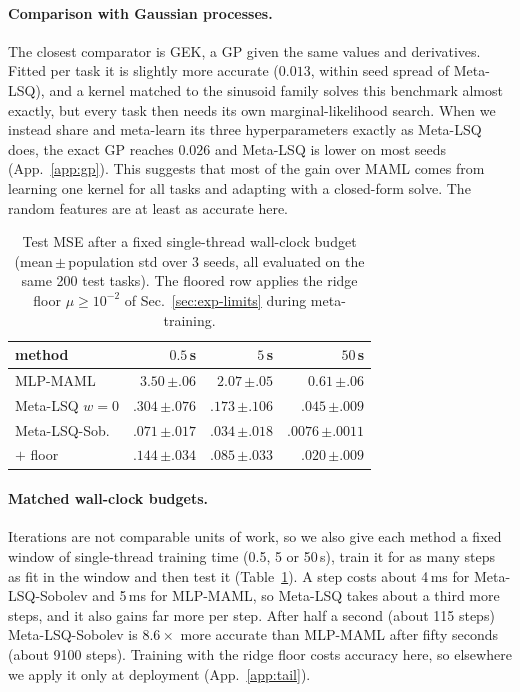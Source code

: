 \documentclass[fullpaper,final]{nldl}
\theoremstyle{plain}
\theoremstyle{definition}
\begin{document}
\paragraph{Comparison with Gaussian processes.}
The closest comparator is GEK, a GP given the same values and derivatives. Fitted
per task it is
slightly more accurate ($0.013$, within seed spread of Meta-LSQ), and a kernel
matched to the sinusoid family solves this benchmark almost exactly, but every task
then needs its own marginal-likelihood search. When we instead share and meta-learn
its three hyperparameters exactly as Meta-LSQ does, the exact GP reaches $0.026$ and
Meta-LSQ is lower on most seeds (App.~\ref{app:gp}). This suggests that most of the
gain over MAML comes from learning one kernel for all tasks and adapting with a
closed-form solve. The random features are at least as accurate here.

\begin{table}[tb]
\centering
\caption{Test MSE after a fixed single-thread wall-clock budget (mean\,$\pm$\,population
std over 3 seeds, all evaluated on the same 200 test tasks). The floored row
applies the ridge floor $\mu \geq 10^{-2}$ of Sec.~\ref{sec:exp-limits} during
meta-training.}
\label{tab:wallclock}
\footnotesize
\setlength{\tabcolsep}{2pt}
\begin{tabular}{lrrr}
\toprule
method & $0.5$\,s & $5$\,s & $50$\,s \\
\midrule
MLP-MAML           & $3.50$\,\tiny$\pm.06$   & $2.07$\,\tiny$\pm.05$   & $0.61$\,\tiny$\pm.06$ \\
Meta-LSQ $w{=}0$   & $.304$\,\tiny$\pm.076$  & $.173$\,\tiny$\pm.106$  & $.045$\,\tiny$\pm.009$ \\
Meta-LSQ-Sob.\     & $\mathbf{.071}$\,\tiny$\pm.017$ & $\mathbf{.034}$\,\tiny$\pm.018$ & $\mathbf{.0076}$\,\tiny$\pm.0011$ \\
\quad $+$ floor    & $.144$\,\tiny$\pm.034$  & $.085$\,\tiny$\pm.033$  & $.020$\,\tiny$\pm.009$ \\
\bottomrule
\end{tabular}
\end{table}

\paragraph{Matched wall-clock budgets.}
Iterations are not comparable units of work, so we also give each method a fixed
window of single-thread training time (0.5, 5 or 50\,s), train it for as many steps
as fit in the window and then test it (Table~\ref{tab:wallclock}). A step costs
about 4\,ms for Meta-LSQ-Sobolev and 5\,ms for MLP-MAML, so Meta-LSQ takes about a
third more steps, and it also gains far more per step. After half a second (about 115 steps) Meta-LSQ-Sobolev is
$8.6\times$ more accurate than MLP-MAML after fifty seconds (about 9100 steps).
Training with the ridge floor costs accuracy here, so elsewhere we apply it only at
deployment (App.~\ref{app:tail}).
\end{document}
